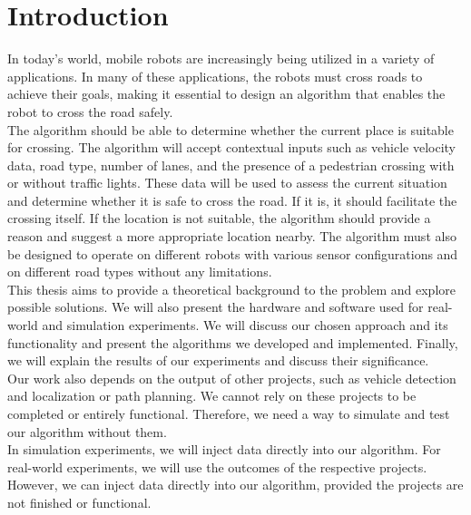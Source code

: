 \chapter*{Introduction}
        In today's world, mobile robots are increasingly being utilized in a variety of applications. In many of these applications, the robots must cross roads to achieve their goals, making it essential to design an algorithm that enables the robot to cross the road safely.\\
        The algorithm should be able to determine whether the current place is suitable for crossing. The algorithm will accept contextual inputs such as vehicle velocity data, road type, number of lanes, and the presence of a pedestrian crossing with or without traffic lights. These data will be used to assess the current situation and determine whether it is safe to cross the road. If it is, it should facilitate the crossing itself. If the location is not suitable, the algorithm should provide a reason and suggest a more appropriate location nearby. The algorithm must also be designed to operate on different robots with various sensor configurations and on different road types without any limitations.\\
        This thesis aims to provide a theoretical background to the problem and explore possible solutions. We will also present the hardware and software used for real-world and simulation experiments. We will discuss our chosen approach and its functionality and present the algorithms we developed and implemented. Finally, we will explain the results of our experiments and discuss their significance.\\
        Our work also depends on the output of other projects, such as vehicle detection and localization or path planning. We cannot rely on these projects to be completed or entirely functional. Therefore, we need a way to simulate and test our algorithm without them.\\
        In simulation experiments, we will inject data directly into our algorithm. For real-world experiments, we will use the outcomes of the respective projects. However, we can inject data directly into our algorithm, provided the projects are not finished or functional.
